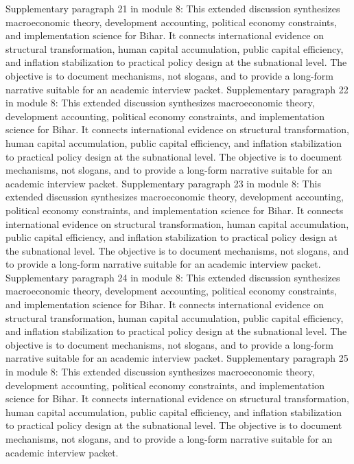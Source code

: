 \documentclass[preprint,12pt]{elsarticle}
\begin{document}
Supplementary paragraph 21 in module 8: This extended discussion synthesizes macroeconomic theory, development accounting, political economy constraints, and implementation science for Bihar. It connects international evidence on structural transformation, human capital accumulation, public capital efficiency, and inflation stabilization to practical policy design at the subnational level. The objective is to document mechanisms, not slogans, and to provide a long-form narrative suitable for an academic interview packet.
Supplementary paragraph 22 in module 8: This extended discussion synthesizes macroeconomic theory, development accounting, political economy constraints, and implementation science for Bihar. It connects international evidence on structural transformation, human capital accumulation, public capital efficiency, and inflation stabilization to practical policy design at the subnational level. The objective is to document mechanisms, not slogans, and to provide a long-form narrative suitable for an academic interview packet.
Supplementary paragraph 23 in module 8: This extended discussion synthesizes macroeconomic theory, development accounting, political economy constraints, and implementation science for Bihar. It connects international evidence on structural transformation, human capital accumulation, public capital efficiency, and inflation stabilization to practical policy design at the subnational level. The objective is to document mechanisms, not slogans, and to provide a long-form narrative suitable for an academic interview packet.
Supplementary paragraph 24 in module 8: This extended discussion synthesizes macroeconomic theory, development accounting, political economy constraints, and implementation science for Bihar. It connects international evidence on structural transformation, human capital accumulation, public capital efficiency, and inflation stabilization to practical policy design at the subnational level. The objective is to document mechanisms, not slogans, and to provide a long-form narrative suitable for an academic interview packet.
Supplementary paragraph 25 in module 8: This extended discussion synthesizes macroeconomic theory, development accounting, political economy constraints, and implementation science for Bihar. It connects international evidence on structural transformation, human capital accumulation, public capital efficiency, and inflation stabilization to practical policy design at the subnational level. The objective is to document mechanisms, not slogans, and to provide a long-form narrative suitable for an academic interview packet.
\end{document}
